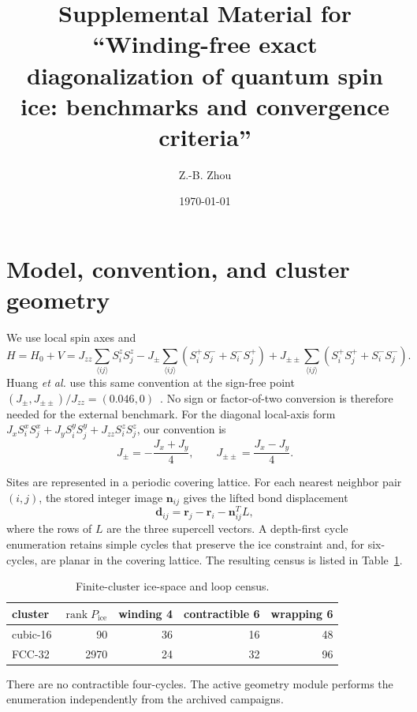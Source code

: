 \documentclass[aps,prl,onecolumn,amsmath,amssymb]{revtex4-2}
\newcommand{\Jzz}{J_{zz}}
\newcommand{\Jpm}{J_{\pm}}
\newcommand{\Jpp}{J_{\pm\pm}}
\newcommand{\Pice}{P_{\mathrm{ice}}}
\begin{document}
\title{Supplemental Material for ``Winding-free exact diagonalization
of quantum spin ice: benchmarks and convergence criteria''}
\author{Z.-B. Zhou}
\date{\today}
\maketitle

\section{Model, convention, and cluster geometry}

We use local spin axes and
\begin{equation}
H=H_0+V=\Jzz\sum_{\langle ij\rangle}S_i^zS_j^z
-\Jpm\sum_{\langle ij\rangle}(S_i^+S_j^-+S_i^-S_j^+)
+\Jpp\sum_{\langle ij\rangle}(S_i^+S_j^++S_i^-S_j^-).
\label{eq:model_si}
\end{equation}
Huang \emph{et al.} use this same convention at the sign-free point
$(\Jpm,\Jpp)/\Jzz=(0.046,0)$~\cite{Huang2018}.  No sign or factor-of-two conversion is
therefore needed for the external benchmark.
For the diagonal local-axis form
$J_xS_i^xS_j^x+J_yS_i^yS_j^y+\Jzz S_i^zS_j^z$, our convention is
\begin{equation}
 \Jpm=-\frac{J_x+J_y}{4},\qquad
 \Jpp=\frac{J_x-J_y}{4}.
\end{equation}

Sites are represented in a periodic covering lattice.  For each nearest
neighbor pair $(i,j)$, the stored integer image $\bm n_{ij}$ gives the lifted
bond displacement
\begin{equation}
 \bm d_{ij}=\bm r_j-\bm r_i-\bm n_{ij}^{T}L,
\end{equation}
where the rows of $L$ are the three supercell vectors.  A depth-first cycle
enumeration retains simple cycles that preserve the ice constraint and, for
six-cycles, are planar in the covering lattice.  The resulting census is
listed in Table~\ref{tab:cluster_census}.
\begin{table}[htbp]
\caption{Finite-cluster ice-space and loop census.}
\label{tab:cluster_census}
\centering
\begin{tabular}{lrrrr}
\toprule
cluster & $\operatorname{rank}\Pice$ & winding 4 & contractible 6 & wrapping 6\\
\midrule
cubic-16 & 90 & 36 & 16 & 48\\
FCC-32 & 2970 & 24 & 32 & 96\\
\bottomrule
\end{tabular}
\end{table}
There are no contractible four-cycles.  The active geometry module performs
the enumeration independently from the archived campaigns.
\end{document}
